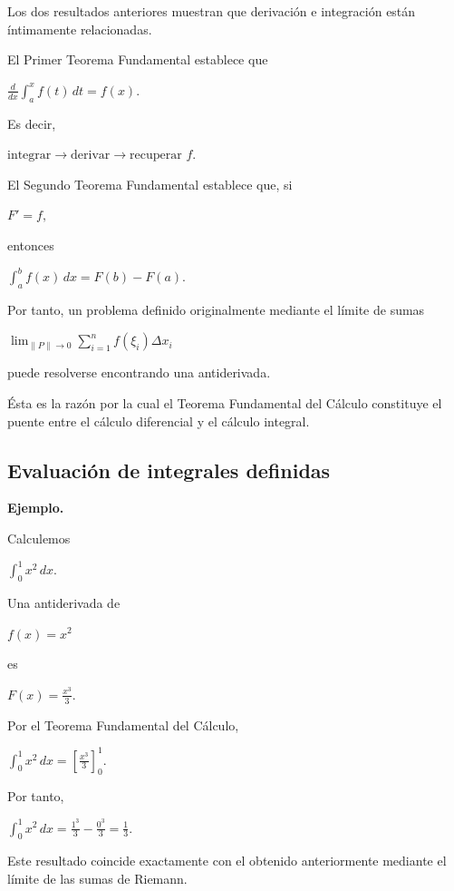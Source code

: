 \documentclass[12pt]{article}
\newenvironment{Ejem}
{\par\medskip\noindent\textbf{Ejemplo.}\ }
{\par\medskip}
\begin{document}
Los dos resultados anteriores muestran que derivación e integración están
íntimamente relacionadas.

El Primer Teorema Fundamental establece que

$
\boxed{
\frac{d}{dx}
\int_a^x f(t)\,dt
=
f(x).
}
$

Es decir,

$
\text{integrar}
\longrightarrow
\text{derivar}
\longrightarrow
\text{recuperar }f.
$

El Segundo Teorema Fundamental establece que, si

$
F'=f,
$

entonces

$
\boxed{
\int_a^b f(x)\,dx
=
F(b)-F(a).
}
$

Por tanto, un problema definido originalmente mediante el límite de sumas

$
\lim_{\|P\|\to0}
\sum_{i=1}^{n}f(\xi_i)\Delta x_i
$

puede resolverse encontrando una antiderivada.

Ésta es la razón por la cual el Teorema Fundamental del Cálculo constituye
el puente entre el cálculo diferencial y el cálculo integral.

\subsection*{Evaluación de integrales definidas}

\begin{Ejem}

Calculemos

$
\int_0^1 x^2\,dx.
$

Una antiderivada de

$
f(x)=x^2
$

es

$
F(x)=\frac{x^3}{3}.
$

Por el Teorema Fundamental del Cálculo,

$
\int_0^1x^2\,dx
=
\left[
\frac{x^3}{3}
\right]_0^1.
$

Por tanto,

$
\int_0^1x^2\,dx
=
\frac{1^3}{3}
-
\frac{0^3}{3}
=
\boxed{\frac13}.
$

Este resultado coincide exactamente con el obtenido anteriormente mediante
el límite de las sumas de Riemann.

\end{Ejem}
\end{document}
